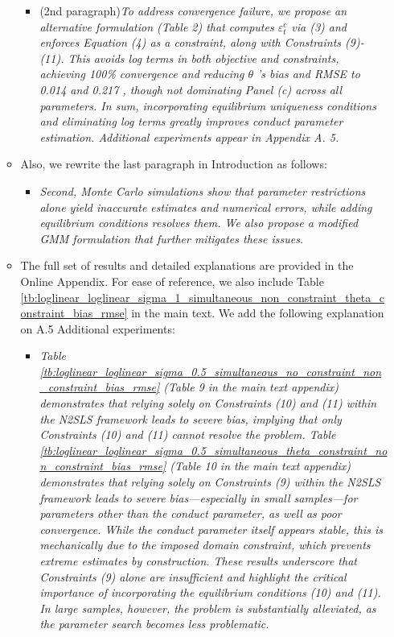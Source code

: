 \documentclass[11pt, a4paper]{article}
\theoremstyle{remark}
\begin{document}
\begin{enumerate}
\begin{itemize}
\begin{itemize}
            \item (2nd paragraph)\textit{To address convergence failure, we propose an alternative formulation (Table 2) that computes $\varepsilon_t^c$ via (3) and enforces Equation (4) as a constraint, along with Constraints (9)-(11). This avoids log terms in both objective and constraints, achieving 100\% convergence and reducing $\theta$ 's bias and RMSE to 0.014 and 0.217 , though not dominating Panel (c) across all parameters. In sum, incorporating equilibrium uniqueness conditions and eliminating log terms greatly improves conduct parameter estimation. Additional experiments appear in Appendix A. 5.}
        \end{itemize}
        \item Also, we rewrite the last paragraph in Introduction as follows:
        \begin{itemize}
            \item \textit{Second, Monte Carlo simulations show that parameter restrictions alone yield inaccurate estimates and numerical errors, while adding equilibrium conditions resolves them. We also propose a modified GMM formulation that further mitigates these issues.}
        \end{itemize}
        \item The full set of results and detailed explanations are provided in the Online Appendix. For ease of reference, we also include Table \ref{tb:loglinear_loglinear_sigma_1_simultaneous_non_constraint_theta_constraint_bias_rmse} in the main text. We add the following explanation on A.5 Additional experiments:
        \begin{itemize}
            \item \textit{Table \ref{tb:loglinear_loglinear_sigma_0.5_simultaneous_no_constraint_non_constraint_bias_rmse} (Table 9 in the main text appendix) demonstrates that relying solely on Constraints (10) and (11) within the N2SLS framework leads to severe bias, implying that only Constraints (10) and (11) cannot resolve the problem. Table \ref{tb:loglinear_loglinear_sigma_0.5_simultaneous_theta_constraint_non_constraint_bias_rmse} (Table 10 in the main text appendix) demonstrates that relying solely on Constraints (9) within the N2SLS framework leads to severe bias—especially in small samples—for parameters other than the conduct parameter, as well as poor convergence. While the conduct parameter itself appears stable, this is mechanically due to the imposed domain constraint, which prevents extreme estimates by construction. These results underscore that Constraints (9) alone are insufficient and highlight the critical importance of incorporating the equilibrium conditions (10) and (11). In large samples, however, the problem is substantially alleviated, as the parameter search becomes less problematic. }
        \end{itemize}
        

\end{itemize}
\end{enumerate}
\end{document}
